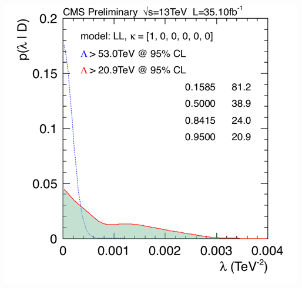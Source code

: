 \documentclass[t,professionalfonts,handout, xcolor=pdftex,dvipsnames,table]{beamer}
\begin{document}
\begin{frame}
\begin{columns}[T]
\begin{column}{0.49\textwidth}
\includegraphics[width=\textwidth]{limit_d.png}
\end{column}

\end{columns}

\end{frame}

\end{document}
